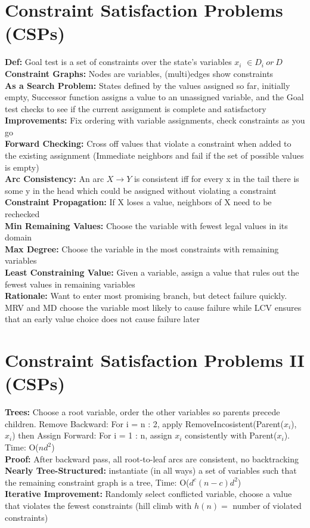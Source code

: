 \documentclass[11pt, a4paper]{article}
\begin{document}
\begin{multicols*}{1}
        \section*{Constraint Satisfaction Problems (CSPs)}
            \textbf{Def:} Goal test is a set of constraints over the state's variables $x_i$ $\in D_i\ or\ D$\\
            \textbf{Constraint Graphs:} Nodes are variables, (multi)edges show constraints\\
            \textbf{As a Search Problem:} States defined by the values assigned so far, initially empty, Successor function assigns a value to an unassigned variable, and the Goal test checks to see if the current assignment is complete and satisfactory\\
            \textbf{Improvements:} Fix ordering with variable assignments, check constraints as you go\\
            \textbf{Forward Checking:} Cross off values that violate a constraint when added to the existing assignment (Immediate neighbors and fail if the set of possible values is empty)\\
            \textbf{Arc Consistency:} An arc $X \to Y$ is consistent iff for every x in the tail there is some y in the head which could be assigned without violating a constraint\\
            \textbf{Constraint Propagation:} If X loses a value, neighbors of X need to be rechecked\\
            \textbf{Min Remaining Values:} Choose the variable with fewest legal values in its domain\\
            \textbf{Max Degree:} Choose the variable in the most constraints with remaining variables\\
            \textbf{Least Constraining Value:} Given a variable, assign a value that rules out the fewest values in remaining variables\\
            \textbf{Rationale:} Want to enter most promising branch, but detect failure quickly. MRV and MD choose the variable most likely to cause failure while LCV ensures that an early value choice does not cause failure later
        \newpage
        \section*{Constraint Satisfaction Problems II (CSPs)}
            \textbf{Trees:} Choose a root variable, order the other variables so parents precede children. Remove Backward: For i = n : 2, apply RemoveIncosistent(Parent($x_i$), $x_i$) then Assign Forward: For i = 1 : n, assign $x_i$ consistently with Parent($x_i$). Time: O($nd^2$)\\
            \textbf{Proof:} After backward pass, all root-to-leaf arcs are consistent, no backtracking\\
            \textbf{Nearly Tree-Structured:} instantiate (in all ways) a set of variables such that the remaining constraint graph is a tree, Time: O($d^c(n - c)d^2$)\\
            \textbf{Iterative Improvement:} Randomly select conflicted variable, choose a value that violates the fewest constraints (hill climb with $h(n)=$ number of violated constraints)

\end{multicols*}
\end{document}
